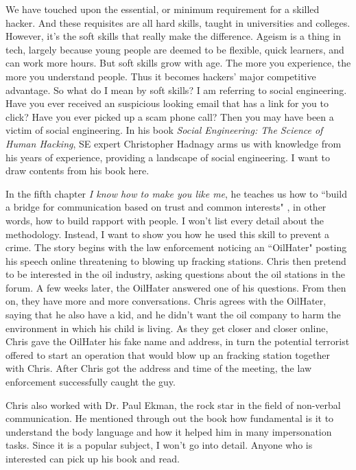 \documentclass{article}
\begin{document}
We have touched upon the essential, or minimum requirement for a skilled hacker. And these requisites are all hard skills, taught in universities and colleges. However, it's the soft skills that really make the difference. Ageism is a thing in tech, largely because young people are deemed to be flexible, quick learners, and can work more hours. But soft skills grow with age. The more you experience, the more you understand people. Thus it becomes hackers' major competitive advantage. So what do I mean by soft skills? I am referring to social engineering. Have you ever received an suspicious looking email that has a link for you to click? Have you ever picked up a scam phone call? Then you may have been a victim of social engineering. In his book \textit{Social Engineering: The Science of Human Hacking}, SE expert Christopher Hadnagy arms us with knowledge from his years of experience, providing a landscape of social engineering. I want to draw contents from his book here.

In the fifth chapter \textit{I know how to make you like me}, he teaches us how to ``build a bridge for communication based on trust and common interests" \cite{Hadnagy2018}, in other words, how to build rapport with people. I won't list every detail about the methodology. Instead, I want to show you how he used this skill to prevent a crime. The story begins with the law enforcement noticing an ``OilHater" posting his speech online threatening to blowing up fracking stations. Chris then pretend to be interested in the oil industry, asking questions about the oil stations in the forum. A few weeks later, the OilHater answered one of his questions. From then on, they have more and more conversations. Chris agrees with the OilHater, saying that he also have a kid, and he didn't want the oil company to harm the environment in which his child is living. As they get closer and closer online, Chris gave the OilHater his fake name and address, in turn the potential terrorist offered to start an operation that would blow up an fracking station together with Chris. After Chris got the address and time of the meeting, the law enforcement successfully caught the guy.

Chris also worked with Dr. Paul Ekman, the rock star in the field of non-verbal communication. He mentioned through out the book how fundamental is it to understand the body language and how it helped him in many impersonation tasks. Since it is a popular subject, I won't go into detail. Anyone who is interested can pick up his book and read.
\end{document}

